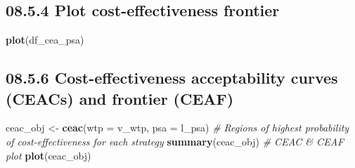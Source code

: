 \documentclass[
]{article}
\newenvironment{Shaded}{\begin{snugshade}}{\end{snugshade}}
\newcommand{\CommentTok}[1]{\textcolor[rgb]{0.56,0.35,0.01}{\textit{#1}}}
\newcommand{\DataTypeTok}[1]{\textcolor[rgb]{0.13,0.29,0.53}{#1}}
\newcommand{\KeywordTok}[1]{\textcolor[rgb]{0.13,0.29,0.53}{\textbf{#1}}}
\newcommand{\NormalTok}[1]{#1}
\newcommand{\OperatorTok}[1]{\textcolor[rgb]{0.81,0.36,0.00}{\textbf{#1}}}
\newcommand{\StringTok}[1]{\textcolor[rgb]{0.31,0.60,0.02}{#1}}
\begin{document}
\begin{Shaded}
\end{Shaded}

\hypertarget{plot-cost-effectiveness-frontier}{%
\subsection{08.5.4 Plot cost-effectiveness
frontier}\label{plot-cost-effectiveness-frontier}}

\begin{Shaded}
\begin{Highlighting}[]
\KeywordTok{plot}\NormalTok{(df_cea_psa)}
\end{Highlighting}
\end{Shaded}

\hypertarget{cost-effectiveness-acceptability-curves-ceacs-and-frontier-ceaf}{%
\subsection{08.5.6 Cost-effectiveness acceptability curves (CEACs) and
frontier
(CEAF)}\label{cost-effectiveness-acceptability-curves-ceacs-and-frontier-ceaf}}

\begin{Shaded}
\begin{Highlighting}[]
\NormalTok{ceac_obj <-}\StringTok{ }\KeywordTok{ceac}\NormalTok{(}\DataTypeTok{wtp =}\NormalTok{ v_wtp, }\DataTypeTok{psa =}\NormalTok{ l_psa)}
\CommentTok{# Regions of highest probability of cost-effectiveness for each strategy}
\KeywordTok{summary}\NormalTok{(ceac_obj)}
\CommentTok{# CEAC & CEAF plot}
\KeywordTok{plot}\NormalTok{(ceac_obj)}
\end{Highlighting}
\end{Shaded}
\end{document}
